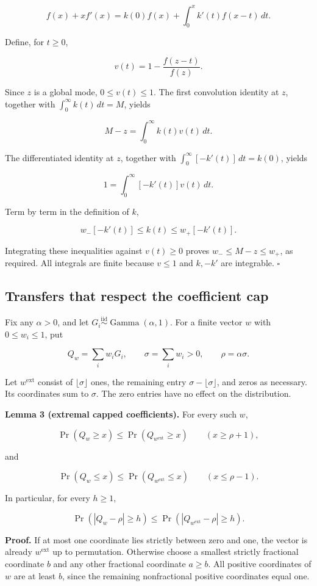 \documentclass[10pt,a4paper]{article}
\begin{document}
\[
f(x)+xf'(x)=k(0)f(x)+\int_0^x k'(t)f(x-t)\,dt.
\]

Define, for \(t\ge0\),

\[
v(t)=1-\frac{f(z-t)}{f(z)}.
\]

Since \(z\) is a global mode, \(0\le v(t)\le1\). The first convolution
identity at \(z\), together with \(\int_0^\infty k(t)\,dt=M\), yields

\[
M-z=\int_0^\infty k(t)v(t)\,dt.
\]

The differentiated identity at \(z\), together with
\(\int_0^\infty[-k'(t)]\,dt=k(0)\), yields

\[
1=\int_0^\infty[-k'(t)]v(t)\,dt.
\]

Term by term in the definition of \(k\),

\[
w_-[-k'(t)]\le k(t)\le w_+[-k'(t)].
\]

Integrating these inequalities against \(v(t)\ge0\) proves
\(w_-\le M-z\le w_+\), as required. All integrals are finite because
\(v\le1\) and \(k,-k'\) are integrable. \(\square\)

\subsection{Transfers that respect the coefficient
cap}\label{transfers-that-respect-the-coefficient-cap}

Fix any \(\alpha>0\), and let
\(G_i\overset{\mathrm{iid}}\sim\operatorname{Gamma}(\alpha,1)\). For a
finite vector \(w\) with \(0\le w_i\le1\), put

\[
Q_w=\sum_i w_iG_i,
\qquad \sigma=\sum_iw_i>0,
\qquad \rho=\alpha\sigma.
\]

Let \(w^{\mathrm{ext}}\) consist of \(\lfloor\sigma\rfloor\) ones, the
remaining entry \(\sigma-\lfloor\sigma\rfloor\), and zeros as necessary.
Its coordinates sum to \(\sigma\). The zero entries have no effect on
the distribution.

\textbf{Lemma 3 (extremal capped coefficients).} For every such \(w\),

\[
\Pr(Q_w\ge x)\le\Pr(Q_{w^{\mathrm{ext}}}\ge x)
\qquad(x\ge\rho+1),
\]

and

\[
\Pr(Q_w\le x)\le\Pr(Q_{w^{\mathrm{ext}}}\le x)
\qquad(x\le\rho-1).
\]

In particular, for every \(h\ge1\),

\[
\Pr(|Q_w-\rho|\ge h)
\le\Pr(|Q_{w^{\mathrm{ext}}}-\rho|\ge h).
\]

\textbf{Proof.} If at most one coordinate lies strictly between zero and
one, the vector is already \(w^{\mathrm{ext}}\) up to permutation.
Otherwise choose a smallest strictly fractional coordinate \(b\) and any
other fractional coordinate \(a\ge b\). All positive coordinates of
\(w\) are at least \(b\), since the remaining nonfractional positive
coordinates equal one.
\end{document}
